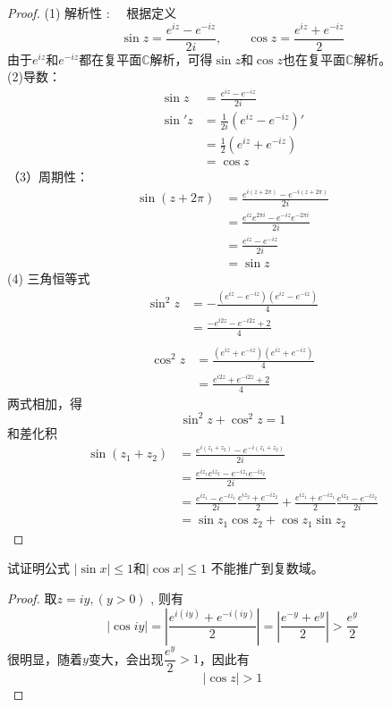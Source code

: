 \begin{proof}
  (1) 解析性 : 　根据定义
  \[\sin z =  \frac{e^{iz} - e^{-iz} }{2i}, \qquad \cos z =  \frac{e^{iz} + e^{-iz} }{2}\]
  由于$e^{iz}$和$e^{-iz}$都在复平面$\mathbb{C}$解析，可得$\sin z$和$\cos z $也在复平面$\mathbb{C}$解析。\\ 
  (2)导数：
  \[ \begin{aligned}
    \sin z &=  \frac{e^{iz} - e^{-iz} }{2i} \\
    \sin' z &=  \frac{1}{2i} (e^{iz} - e^{-iz} )'\\
    &= \frac{1}{2} (e^{iz} + e^{-iz} ) \\
    & = \cos z
  \end{aligned}\]
  （3）周期性： 
  \[ \begin{aligned}
    \sin (z+2\pi) &=  \frac{e^{i(z+2\pi)} - e^{-i(z+2\pi)} }{2i} \\
    & =  \frac{e^{iz}e^{2\pi i}  - e^{-iz}e^{-2\pi i}  }{2i} \\
    &=  \frac{e^{iz} - e^{-iz} }{2i} \\
    & = \sin z
  \end{aligned}\]
  (4) 三角恒等式 \\
  \[ \begin{aligned}
    \sin^2 z & = -\frac{(e^{iz} - e^{-iz})(e^{iz} - e^{-iz}) }{4}  \\
    & = \frac{ - e^{i2z} - e^{-i2z} + 2 }{4} \\
  \end{aligned}\]
  \[ \begin{aligned}
    \cos^2 z & = \frac{(e^{iz} + e^{-iz})(e^{iz} + e^{-iz}) }{4}  \\
    & = \frac{ e^{i2z} + e^{-i2z} + 2 }{4} 
  \end{aligned}\]
  两式相加，得
  \[ \sin^2 z + \cos^2 z =1 \]
  和差化积 
  \[ \begin{aligned}
   \sin(z_1 + z_2) & =  \frac{e^{i(z_1+z_2)} - e^{-i(z_1+z_2)} }{2i} \\
   & =   \frac{e^{iz_1} e^{iz_2}  - e^{-iz_1} e^{-iz_2}}{2i} \\
   & =   \frac{e^{iz_1} - e^{-iz_1} }{2i} \frac{e^{iz_2} + e^{-iz_2} }{2} + \frac{e^{iz_1} + e^{-iz_1} }{2} \frac{e^{iz_2} - e^{-iz_2} }{2i}  \\
   & = \sin z_1 \cos z_2 + \cos z_1 \sin z_2 
  \end{aligned}\]

\end{proof}

\begin{example}
  试证明公式 $|\sin x| \le 1 $和$| \cos x| \le 1 $ 不能推广到复数域。
\end{example}
\begin{proof}
  取$z = iy, (y>0)$ , 则有 
  \[ |\cos iy | =  |\frac{e^{i(iy)} + e^{-i(iy)} }{2} | =  |\frac{e^{-y} + e^{y} }{2} | >   \frac{e^{y} }{2} \]
  很明显，随着$y$变大，会出现$\dfrac{e^{y} }{2} > 1$，因此有 
  \[ |\cos z | >1\]
\end{proof}

